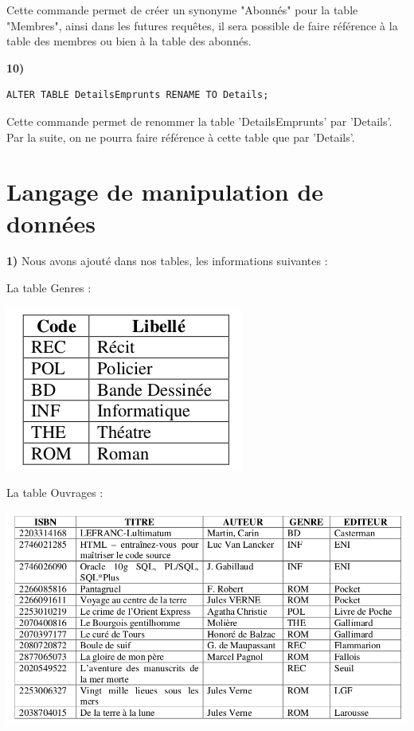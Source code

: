 \documentclass[a4paper,12pt]{article}
\begin{document}
Cette commande permet de créer un synonyme "Abonnés" pour la table "Membres", ainsi dans les futures requêtes, il sera possible de faire référence à la table des membres ou bien à la table des abonnés.

\textbf {10) }
 \begin{lstlisting}
ALTER TABLE DetailsEmprunts RENAME TO Details;
 \end{lstlisting}

Cette commande permet de renommer la table 'DetailsEmprunts' par 'Details'. Par la suite, on ne pourra faire référence à cette table que par 'Details'. 

\clearpage

\section{Langage de manipulation de données}

\textbf {1) }Nous avons ajouté dans nos tables, les informations suivantes : 

La table Genres :
\begin{center}
    \includegraphics[scale=0.5]{genres.png}
\end{center}
La table Ouvrages : 
\begin{center}
    \includegraphics[scale=0.5]{ouvrages.png}
\end{center}
\end{document}
